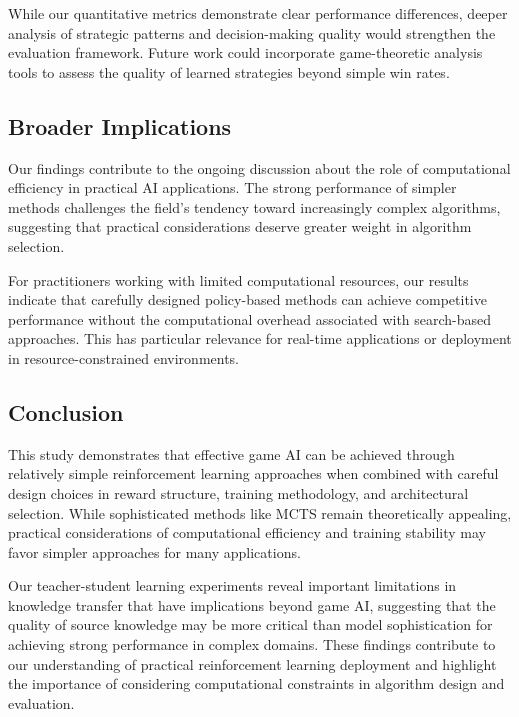 \documentclass[conference]{IEEEtran}
\begin{document}
While our quantitative metrics demonstrate clear performance differences, deeper analysis of strategic patterns and decision-making quality would strengthen the evaluation framework. Future work could incorporate game-theoretic analysis tools to assess the quality of learned strategies beyond simple win rates.

\subsection{Broader Implications}

Our findings contribute to the ongoing discussion about the role of computational efficiency in practical AI applications. The strong performance of simpler methods challenges the field's tendency toward increasingly complex algorithms, suggesting that practical considerations deserve greater weight in algorithm selection.

For practitioners working with limited computational resources, our results indicate that carefully designed policy-based methods can achieve competitive performance without the computational overhead associated with search-based approaches. This has particular relevance for real-time applications or deployment in resource-constrained environments.

\subsection{Conclusion}

This study demonstrates that effective game AI can be achieved through relatively simple reinforcement learning approaches when combined with careful design choices in reward structure, training methodology, and architectural selection. While sophisticated methods like MCTS remain theoretically appealing, practical considerations of computational efficiency and training stability may favor simpler approaches for many applications.

Our teacher-student learning experiments reveal important limitations in knowledge transfer that have implications beyond game AI, suggesting that the quality of source knowledge may be more critical than model sophistication for achieving strong performance in complex domains. These findings contribute to our understanding of practical reinforcement learning deployment and highlight the importance of considering computational constraints in algorithm design and evaluation.
\end{document}
